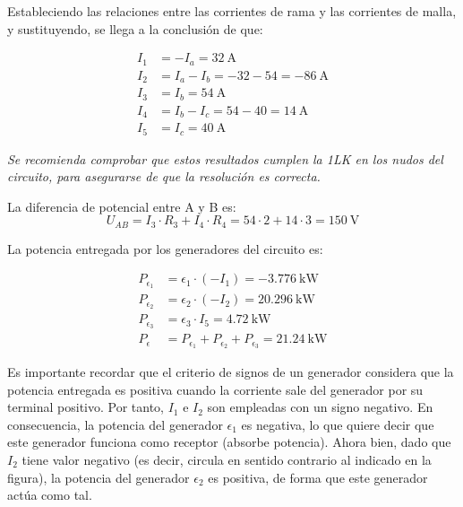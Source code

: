 Estableciendo las relaciones entre las corrientes de rama y las
corrientes de malla, y sustituyendo, se llega a la conclusión de que:

\vspace{-4mm}
\begin{align*}
  I_1 &= -I_a=\qty{32}{\ampere}\\
  I_2 &= I_a - I_b=-32-54=\qty{-86}{\ampere}\\
  I_3 &= I_b=\qty{54}{\ampere}\\
  I_4 &= I_b - I_c=54-40=\qty{14}{\ampere}\\
  I_5 &= I_c=\qty{40}{\ampere}
\end{align*}

\emph{Se recomienda comprobar que estos resultados cumplen la 1LK en
  los nudos del circuito, para asegurarse de que la resolución es
  correcta.}

\vspace{4mm}
La diferencia de potencial entre A y B es:
\begin{equation*}
  U_{AB} = I_3 \cdot R_3 + I_4 \cdot R_4 = 54\cdot 2+14\cdot 3= \qty{150}{\volt}
\end{equation*}

La potencia entregada por los generadores del circuito es:

\vspace{-4mm}
\begin{align*}
  P_{\epsilon_1} &= \epsilon_1 \cdot (-I_1) = -\qty{3,776}{\kilo\watt}\\
  P_{\epsilon_2} &= \epsilon_2 \cdot (-I_2) = \qty{20,296}{\kilo\watt}\\
  P_{\epsilon_3} &= \epsilon_3 \cdot I_5 = \qty{4,72}{\kilo\watt}\\
  P_\epsilon &= P_{\epsilon_1} + P_{\epsilon_2} + P_{\epsilon_3} = \qty{21,24}{\kilo\watt}  
\end{align*}

Es importante recordar que el criterio de signos de un generador considera que la potencia entregada es positiva cuando la corriente sale del generador por su terminal positivo. Por tanto, $I_1$ e $I_2$ son empleadas con un signo negativo. En consecuencia, la potencia del generador $\epsilon_1$ es negativa, lo que quiere decir que este generador funciona como receptor (absorbe potencia). Ahora bien, dado que $I_2$ tiene valor negativo (es decir, circula en sentido contrario al indicado en la figura), la potencia del generador $\epsilon_2$ es positiva, de forma que este generador actúa como tal.

